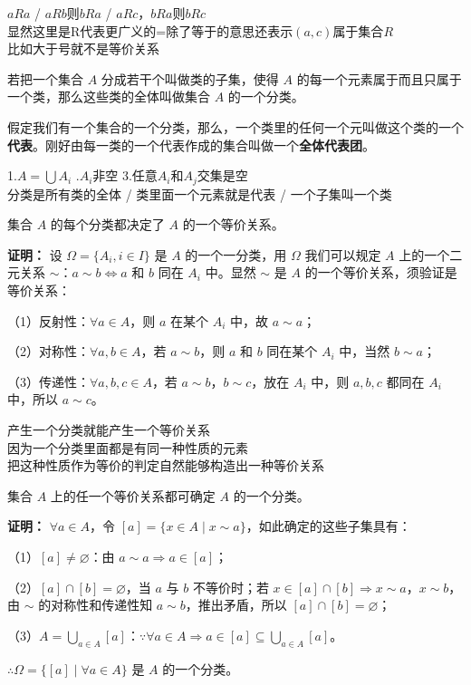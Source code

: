 \begin{note}[等价关系]
$aRa$ / $aRb$则$bRa$ / $aRc$，$bRa$则$bRc$ \\
显然这里是R代表更广义的=除了等于的意思还表示$(a,c)$属于集合$R$ \\
比如大于号就不是等价关系
\end{note}

\begin{definition}[分类]
若把一个集合 $A$ 分成若干个叫做类的子集，使得 $A$ 的每一个元素属于而且只属于一个类，那么这些类的全体叫做集合 $A$ 的一个分类。

假定我们有一个集合的一个分类，那么，一个类里的任何一个元叫做这个类的一个\textbf{代表}。刚好由每一类的一个代表作成的集合叫做一个\textbf{全体代表团}。
\end{definition}

\begin{note}[分类]
1.$A=\bigcup A_i$ .$A_i$非空 \quad 3.任意$A_i$和$A_j$交集是空 \\
分类是所有类的全体 / 类里面一个元素就是代表 / 一个子集叫一个类
\end{note}

\begin{theorem}[分类决定等价关系]
集合 $A$ 的每个分类都决定了 $A$ 的一个等价关系。

\textbf{证明：} 设 $\Omega=\{A_i,i\in I\}$ 是 $A$ 的一个一分类，用 $\Omega$ 我们可以规定 $A$ 上的一个二元关系 $\sim$：$a\sim b\Leftrightarrow a$ 和 $b$ 同在 $A_i$ 中。显然 $\sim$ 是 $A$ 的一个等价关系，须验证是等价关系：

（1）反射性：$\forall a\in A$，则 $a$ 在某个 $A_i$ 中，故 $a\sim a$；

（2）对称性：$\forall a,b\in A$，若 $a\sim b$，则 $a$ 和 $b$ 同在某个 $A_i$ 中，当然 $b\sim a$；

（3）传递性：$\forall a,b,c\in A$，若 $a\sim b$，$b\sim c$，放在 $A_i$ 中，则 $a,b,c$ 都同在 $A_i$ 中，所以 $a\sim c$。
\end{theorem}

\begin{note}[每一个分类都决定了A的一个等价关系]
产生一个分类就能产生一个等价关系 \\
因为一个分类里面都是有同一种性质的元素 \\
把这种性质作为等价的判定自然能够构造出一种等价关系
\end{note}

\begin{theorem}[等价关系决定分类]
集合 $A$ 上的任一个等价关系都可确定 $A$ 的一个分类。

\textbf{证明：} $\forall a\in A$，令 $[a]=\{x\in A\mid x\sim a\}$，如此确定的这些子集具有：

（1）$[a]\ne\varnothing$：由 $a\sim a\Rightarrow a\in[a]$；

（2）$[a]\cap[b]=\varnothing$，当 $a$ 与 $b$ 不等价时；若 $x\in[a]\cap[b]\Rightarrow x\sim a$，$x\sim b$，由 $\sim$ 的对称性和传递性知 $a\sim b$，推出矛盾，所以 $[a]\cap[b]=\varnothing$；

（3）$A=\bigcup_{a\in A}[a]$：$\because\forall a\in A\Rightarrow a\in[a]\subseteq\bigcup_{a\in A}[a]$。

$\therefore\Omega=\{[a]\mid\forall a\in A\}$ 是 $A$ 的一个分类。
\end{theorem}

